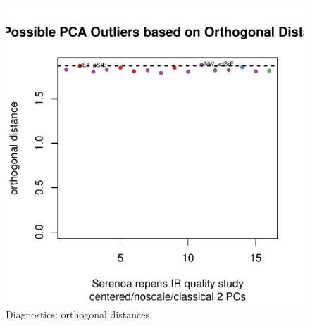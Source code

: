 \documentclass[letter,10pt,twocolumn,twoside,printwatermark=false]{pinp}
\begin{document}
\begin{Shaded}
\begin{Highlighting}[]
\StringTok{ }
   \NormalTok{,}
   \NormalTok{)}
\end{Highlighting}
\end{Shaded}

\begin{figure}

{\centering \includegraphics{ChemoSpec2_files/figure-latex/Chunk22-1} 

}

\caption{\label{OD}Diagnostics: orthogonal distances.}\label{fig:Chunk22}
\end{figure}

\begin{Shaded}
\begin{Highlighting}[]
\StringTok{ }
   \NormalTok{,}
   \NormalTok{)}
\end{Highlighting}
\end{Shaded}
\end{document}
